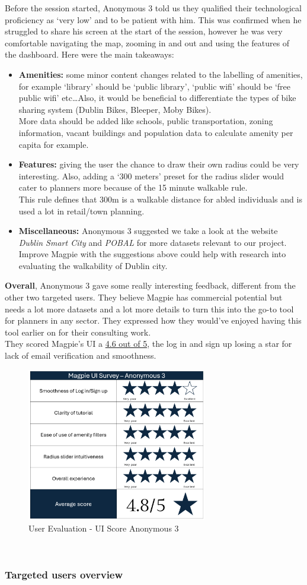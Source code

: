 Before the session started, Anonymous 3 told us they qualified their technological proficiency as `very low' and to be patient with him. This was confirmed when he struggled to share his screen at the start of the session, however he was very comfortable navigating the map, zooming in and out and using the features of the dashboard. Here were the main takeaways:
\begin{itemize}
    \item \textbf{Amenities:} some minor content changes related to the labelling of amenities, for example `library' should be `public library', `public wifi' should be `free public wifi' etc\ldots Also, it would be beneficial to differentiate the types of bike sharing system (Dublin Bikes, Bleeper, Moby Bikes).\\ More data should be added like schools, public transportation, zoning information, vacant buildings and population data to calculate amenity per capita for example.
    \item \textbf{Features:} giving the user the chance to draw their own radius could be very interesting. Also, adding a `300 meters' preset for the radius slider would cater to planners more because of the 15 minute walkable rule.\\ This rule defines that 300m is a walkable distance for abled individuals and is used a lot in retail/town planning.
    \item \textbf{Miscellaneous:} Anonymous 3 suggested we take a look at the website \emph{Dublin Smart City} and \emph{POBAL} for more datasets relevant to our project. Improve Magpie with the suggestions above could help with research into evaluating the walkability of Dublin city.
\end{itemize}
\textbf{Overall}, Anonymous 3 gave some really interesting feedback, different from the other two targeted users. They believe Magpie has commercial potential but needs a lot more datasets and a lot more details to turn this into the go-to tool for planners in any sector. They expressed how they would've enjoyed having this tool earlier on for their consulting work.\\ They scored Magpie's UI a \underline{4.6 out of 5}, the log in and sign up losing a star for lack of email verification and smoothness.
\begin{figure}[h!]
    \centering
    \includegraphics[width=0.7\textwidth]{images/survey-odran.png}
    \caption{User Evaluation - UI Score Anonymous 3}
\end{figure}\\

\newpage
\subsubsection{Targeted users overview}